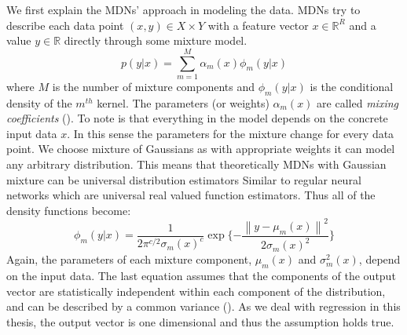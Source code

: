 \documentclass[12pt,a4paper,twoside]{scrartcl}
\numberwithin{equation}{section}
\begin{document}
We first explain the MDNs' approach in modeling the data. MDNs try to describe each data point \((x,y)\in X\times Y\) with a feature vector \(x\in\mathbb{R}^R\) and a value \(y\in\mathbb{R}\) directly through some mixture model.
\begin{equation}
  p(y|x)=\sum_{m=1}^M \alpha_m(x)\phi_m(y|x)
\end{equation}
where \(M\) is the number of mixture components and \(\phi_m(y|x)\) is the conditional density of the \(m^{th}\) kernel. The parameters (or weights) \(\alpha_m(x)\) are called \emph{mixing coefficients} (\cite{bishop1994}). To note is that everything in the model depends on the concrete input data \(x\). In this sense the parameters for the mixture change for every data point. We choose mixture of Gaussians as with appropriate weights it can model any arbitrary distribution. This means that theoretically MDNs with Gaussian mixture can be universal distribution estimators Similar to regular neural networks which are universal real valued function estimators. Thus all of the density functions become:
\begin{equation}
  \phi_m(y|x) = \frac{1}{2\pi^{c/2}\sigma_m(x)^c}\exp\{-\frac{\left\lVert y - \mu_m(x) \right\rVert^2}{2\sigma_m(x)^2}\}
\end{equation}
Again, the parameters of each mixture component, \(\mu_m(x)\) and \(\sigma_m^2(x)\), depend on the input data. The last equation assumes that the components of the output vector are statistically independent within each component of the distribution, and can be described by a common variance (\cite{bishop1994}). As we deal with regression in this thesis, the output vector is one dimensional and thus the assumption holds true.
\end{document}
